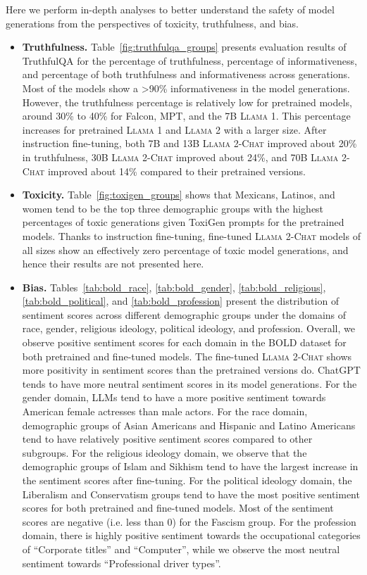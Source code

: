 \documentclass{article}
\newcommand{\modelname}{\textsc{Llama 2-Chat}\xspace}
\newcommand{\anise}{\textsc{Llama 1}\xspace}
\newcommand{\cinnamon}{\textsc{Llama 2}\xspace}
\begin{document}
Here we perform in-depth analyses to better understand the safety of model generations from the perspectives of toxicity, truthfulness, and bias. 
\begin{itemize}
    \item \textbf{Truthfulness.} Table~\ref{fig:truthfulqa_groups} presents evaluation results of TruthfulQA for the percentage of truthfulness, percentage of informativeness, and percentage of both truthfulness and informativeness across generations. 
Most of the models show a >90\% informativeness in the model generations. However, the truthfulness percentage is relatively low for pretrained models, around 30\% to 40\% for Falcon, MPT, and the 7B \anise. This percentage increases for pretrained \anise and \cinnamon with a larger size. 
After instruction fine-tuning, both 7B and 13B \modelname improved about 20\% in truthfulness, 30B \modelname improved about 24\%, and 70B \modelname improved about 14\% compared to their pretrained versions. 
    \item \textbf{Toxicity.} Table~\ref{fig:toxigen_groups} shows that Mexicans, Latinos, and women tend to be the top three demographic groups with the highest percentages of toxic generations given ToxiGen prompts for the pretrained models. 
    Thanks to instruction fine-tuning, fine-tuned \modelname models of all sizes show an effectively zero percentage of toxic model generations, and hence their results are not presented here. 
    \item \textbf{Bias.} 
    Tables~\ref{tab:bold_race}, \ref{tab:bold_gender}, \ref{tab:bold_religious}, \ref{tab:bold_political}, and \ref{tab:bold_profession} present the distribution of sentiment scores across different demographic groups under the domains of race, gender, religious ideology, political ideology, and profession. 
    Overall, we observe positive sentiment scores for each domain in the BOLD dataset for both pretrained and fine-tuned models. 
    The fine-tuned \modelname shows more positivity in sentiment scores than the pretrained versions do. 
    ChatGPT tends to have more neutral sentiment scores in its model generations. 
    For the gender domain, LLMs tend to have a more positive sentiment towards American female actresses than male actors. 
    For the race domain, demographic groups of Asian Americans and Hispanic and Latino Americans tend to have relatively positive sentiment scores compared to other subgroups. 
    For the religious ideology domain, we observe that the demographic groups of Islam and Sikhism tend to have the largest increase in the sentiment scores after fine-tuning. 
    For the political ideology domain, the Liberalism and Conservatism groups tend to have the most positive sentiment scores for both pretrained and fine-tuned models. Most of the sentiment scores are negative (i.e. less than 0) for the Fascism group. 
    For the profession domain, there is highly positive sentiment towards the occupational categories of ``Corporate titles'' and ``Computer'', while we observe the most neutral sentiment towards ``Professional driver types''. 
\end{itemize}
\end{document}
